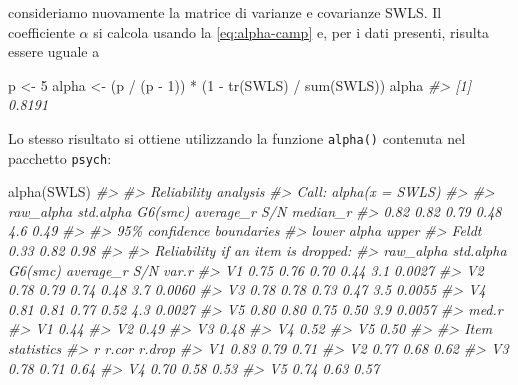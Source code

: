 \documentclass[
  11pt,
]{krantz}
\makeatletter
\newenvironment{Shaded}{\begin{snugshade}}{\end{snugshade}}
\newcommand{\CommentTok}[1]{\textcolor[rgb]{0.37,0.37,0.37}{\textit{#1}}}
\newcommand{\DecValTok}[1]{\textcolor[rgb]{0.06,0.06,0.06}{#1}}
\newcommand{\FunctionTok}[1]{\textcolor[rgb]{0,0,0}{#1}}
\newcommand{\NormalTok}[1]{#1}
\newcommand{\OtherTok}[1]{\textcolor[rgb]{0.37,0.37,0.37}{#1}}
\newcommand{\SpecialCharTok}[1]{\textcolor[rgb]{0,0,0}{#1}}
\newenvironment{kframe}{%
\medskip{}
\setlength{\fboxsep}{.8em}
 \def\at@end@of@kframe{}%
 \ifinner\ifhmode%
  \def\at@end@of@kframe{\end{minipage}}%
  \begin{minipage}{\columnwidth}%
 \fi\fi%
 \def\FrameCommand##1{\hskip\@totalleftmargin \hskip-\fboxsep
 \colorbox{shadecolor}{##1}\hskip-\fboxsep
     \hskip-\linewidth \hskip-\@totalleftmargin \hskip\columnwidth}%
 \MakeFramed {\advance\hsize-\width
   \@totalleftmargin\z@ \linewidth\hsize
   \@setminipage}}%
 {\par\unskip\endMakeFramed%
 \at@end@of@kframe}
\renewenvironment{Shaded}{\begin{kframe}}{\end{kframe}}
\theoremstyle{definition}
\theoremstyle{definition}
\theoremstyle{definition}
\theoremstyle{definition}
\theoremstyle{remark}
\makeatother
\begin{document}
consideriamo nuovamente la matrice di varianze e covarianze SWLS. Il coefficiente \(\alpha\) si calcola usando la \eqref{eq:alpha-camp} e, per i dati presenti, risulta essere uguale a

\begin{Shaded}
\begin{Highlighting}[]
\NormalTok{p }\OtherTok{\textless{}{-}} \DecValTok{5}
\NormalTok{alpha }\OtherTok{\textless{}{-}}\NormalTok{ (p }\SpecialCharTok{/}\NormalTok{ (p }\SpecialCharTok{{-}} \DecValTok{1}\NormalTok{)) }\SpecialCharTok{*}\NormalTok{ (}\DecValTok{1} \SpecialCharTok{{-}} \FunctionTok{tr}\NormalTok{(SWLS) }\SpecialCharTok{/} \FunctionTok{sum}\NormalTok{(SWLS))}
\NormalTok{alpha}
\CommentTok{\#\textgreater{} [1] 0.8191}
\end{Highlighting}
\end{Shaded}

Lo stesso risultato si ottiene utilizzando la funzione \texttt{alpha()} contenuta nel pacchetto \texttt{psych}:

\begin{Shaded}
\begin{Highlighting}[]
\FunctionTok{alpha}\NormalTok{(SWLS)}
\CommentTok{\#\textgreater{} }
\CommentTok{\#\textgreater{} Reliability analysis   }
\CommentTok{\#\textgreater{} Call: alpha(x = SWLS)}
\CommentTok{\#\textgreater{} }
\CommentTok{\#\textgreater{}   raw\_alpha std.alpha G6(smc) average\_r S/N median\_r}
\CommentTok{\#\textgreater{}       0.82      0.82    0.79      0.48 4.6     0.49}
\CommentTok{\#\textgreater{} }
\CommentTok{\#\textgreater{}     95\% confidence boundaries }
\CommentTok{\#\textgreater{}       lower alpha upper}
\CommentTok{\#\textgreater{} Feldt  0.33  0.82  0.98}
\CommentTok{\#\textgreater{} }
\CommentTok{\#\textgreater{}  Reliability if an item is dropped:}
\CommentTok{\#\textgreater{}    raw\_alpha std.alpha G6(smc) average\_r S/N  var.r}
\CommentTok{\#\textgreater{} V1      0.75      0.76    0.70      0.44 3.1 0.0027}
\CommentTok{\#\textgreater{} V2      0.78      0.79    0.74      0.48 3.7 0.0060}
\CommentTok{\#\textgreater{} V3      0.78      0.78    0.73      0.47 3.5 0.0055}
\CommentTok{\#\textgreater{} V4      0.81      0.81    0.77      0.52 4.3 0.0027}
\CommentTok{\#\textgreater{} V5      0.80      0.80    0.75      0.50 3.9 0.0057}
\CommentTok{\#\textgreater{}    med.r}
\CommentTok{\#\textgreater{} V1  0.44}
\CommentTok{\#\textgreater{} V2  0.49}
\CommentTok{\#\textgreater{} V3  0.48}
\CommentTok{\#\textgreater{} V4  0.52}
\CommentTok{\#\textgreater{} V5  0.50}
\CommentTok{\#\textgreater{} }
\CommentTok{\#\textgreater{}  Item statistics }
\CommentTok{\#\textgreater{}       r r.cor r.drop}
\CommentTok{\#\textgreater{} V1 0.83  0.79   0.71}
\CommentTok{\#\textgreater{} V2 0.77  0.68   0.62}
\CommentTok{\#\textgreater{} V3 0.78  0.71   0.64}
\CommentTok{\#\textgreater{} V4 0.70  0.58   0.53}
\CommentTok{\#\textgreater{} V5 0.74  0.63   0.57}
\end{Highlighting}
\end{Shaded}
\end{document}
